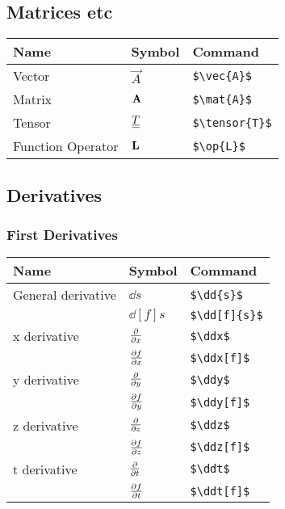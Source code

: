 \documentclass[10pt,letterpaper,oneside]{article}
\begin{document}
\subsection{Matrices etc}
\begin{supertabular}{p{0.4\textwidth}|p{0.3\textwidth}|p{0.3\textwidth}}
  Name & Symbol & Command \\ \hline
  Vector &  $\vec{A}$  &  \lstinline|$\vec{A}$|\\
  Matrix &  $\mat{A}$  &  \lstinline|$\mat{A}$|\\
  Tensor &  $\tensor{T}$  &  \lstinline|$\tensor{T}$|\\
  Function Operator &  $\op{L}$  &  \lstinline|$\op{L}$|\\
\end{supertabular}

\subsection{Derivatives}
\subsubsection{First Derivatives}
\begin{supertabular}{p{0.4\textwidth}|p{0.3\textwidth}|p{0.3\textwidth}}
  Name & Symbol & Command \\ \hline
  General derivative &  $\dd{s}$  &  \lstinline|$\dd{s}$| \\
   & $\dd[f]{s}$  &  \lstinline|$\dd[f]{s}$|\\
  x derivative &  $\ddx$  &  \lstinline|$\ddx$| \\
   & $\ddx[f]$  &  \lstinline|$\ddx[f]$|\\
  y derivative &  $\ddy$  &  \lstinline|$\ddy$| \\
   & $\ddy[f]$  &  \lstinline|$\ddy[f]$|\\
  z derivative &  $\ddz$  &  \lstinline|$\ddz$| \\
   & $\ddz[f]$  &  \lstinline|$\ddz[f]$|\\
  t derivative &  $\ddt$  &  \lstinline|$\ddt$| \\
   & $\ddt[f]$  &  \lstinline|$\ddt[f]$|\\
\end{supertabular}
\end{document}
